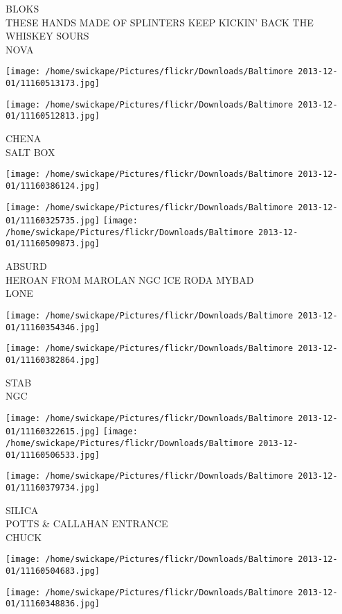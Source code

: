 \documentclass[10pt,letterpaper]{article}
\begin{document}
BLOKS\\
THESE HANDS MADE OF SPLINTERS KEEP KICKIN' BACK THE WHISKEY SOURS\\
NOVA
\pagebreak

\texttt{[image: /home/swickape/Pictures/flickr/Downloads/Baltimore 2013-12-01/11160513173.jpg]}

\vspace{0.25in}
\texttt{[image: /home/swickape/Pictures/flickr/Downloads/Baltimore 2013-12-01/11160512813.jpg]}

CHENA\\
SALT BOX
\pagebreak

\texttt{[image: /home/swickape/Pictures/flickr/Downloads/Baltimore 2013-12-01/11160386124.jpg]}

\vspace{0.25in}
\texttt{[image: /home/swickape/Pictures/flickr/Downloads/Baltimore 2013-12-01/11160325735.jpg]}
\texttt{[image: /home/swickape/Pictures/flickr/Downloads/Baltimore 2013-12-01/11160509873.jpg]}

ABSURD\\
HEROAN FROM MAROLAN NGC ICE RODA MYBAD\\
LONE
\pagebreak

\texttt{[image: /home/swickape/Pictures/flickr/Downloads/Baltimore 2013-12-01/11160354346.jpg]}

\vspace{0.25in}
\texttt{[image: /home/swickape/Pictures/flickr/Downloads/Baltimore 2013-12-01/11160382864.jpg]}

STAB\\
NGC
\pagebreak

\texttt{[image: /home/swickape/Pictures/flickr/Downloads/Baltimore 2013-12-01/11160322615.jpg]}
\texttt{[image: /home/swickape/Pictures/flickr/Downloads/Baltimore 2013-12-01/11160506533.jpg]}

\texttt{[image: /home/swickape/Pictures/flickr/Downloads/Baltimore 2013-12-01/11160379734.jpg]}

SILICA\\
POTTS \& CALLAHAN ENTRANCE\\
CHUCK
\pagebreak

\texttt{[image: /home/swickape/Pictures/flickr/Downloads/Baltimore 2013-12-01/11160504683.jpg]}

\vspace{0.25in}
\texttt{[image: /home/swickape/Pictures/flickr/Downloads/Baltimore 2013-12-01/11160348836.jpg]}
\end{document}
